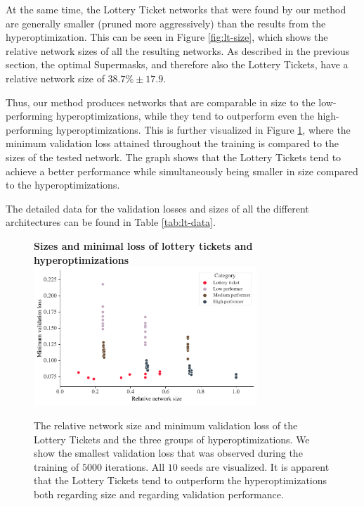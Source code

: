 \documentclass[12pt,final,twoside]{article}
\theoremstyle{plain}
\theoremstyle{definition}
\theoremstyle{remark}
\theoremstyle{named}
\begin{document}
At the same time, the Lottery Ticket networks that were found by our method are generally smaller (pruned more aggressively) than the results from the hyperoptimization. This can be seen in Figure \ref{fig:lt-size}, which shows the relative network sizes of all the resulting networks. As described in the previous section, the optimal Supermasks, and therefore also the Lottery Tickets, have a relative network size of $38.7\% \pm 17.9$.

Thus, our method produces networks that are comparable in size to the low-performing hyperoptimizations, while they tend to outperform even the high-performing hyperoptimizations. This is further visualized in Figure \ref{fig:lt-scatter}, where the minimum validation loss attained throughout the training is compared to the sizes of the tested network. The graph shows that the Lottery Tickets tend to achieve a better performance while simultaneously being smaller in size compared to the hyperoptimizations.

The detailed data for the validation losses and sizes of all the different architectures can be found in Table \ref{tab:lt-data}.

\begin{figure}[t]
  \centering
  \textbf{Sizes and minimal loss of lottery tickets and hyperoptimizations}
  \includegraphics[width=0.75\textwidth]{plots/lt-scatter.pdf}
  \caption{The relative network size and minimum validation loss of the Lottery Tickets and the three groups of hyperoptimizations. We show the smallest validation loss that was observed during the training of $5000$ iterations. All $10$ seeds are visualized. It is apparent that the Lottery Tickets tend to outperform the hyperoptimizations both regarding size and regarding validation performance.}
  \label{fig:lt-scatter}
\end{figure}
\end{document}
